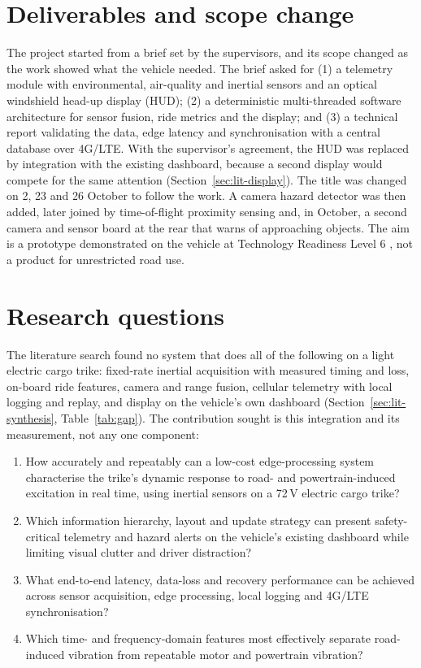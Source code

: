 \section{Deliverables and scope change}

The project started from a brief set by the supervisors, and its scope changed as the work showed what the vehicle needed. The brief \cite{winberg2026} asked for (1) a telemetry module with environmental, air-quality and inertial sensors and an optical windshield head-up display (HUD); (2) a deterministic multi-threaded software architecture for sensor fusion, ride metrics and the display; and (3) a technical report validating the data, edge latency and synchronisation with a central database over 4G/LTE. With the supervisor's agreement, the HUD was replaced by integration with the existing dashboard, because a second display would compete for the same attention \cite{zhu2021} (Section~\ref{sec:lit-display}). The title was changed on 2, 23 and 26 October to follow the work. A camera hazard detector was then added, later joined by time-of-flight proximity sensing and, in October, a second camera and sensor board at the rear that warns of approaching objects. The aim is a prototype demonstrated on the vehicle at Technology Readiness Level 6 \cite{kimmel2020}, not a product for unrestricted road use.

\section{Research questions}
\label{sec:rqs}

The literature search found no system that does all of the following on a light electric cargo trike: fixed-rate inertial acquisition with measured timing and loss, on-board ride features, camera and range fusion, cellular telemetry with local logging and replay, and display on the vehicle's own dashboard (Section~\ref{sec:lit-synthesis}, Table~\ref{tab:gap}). The contribution sought is this integration and its measurement, not any one component:

\begin{enumerate}
\item[RQ1] How accurately and repeatably can a low-cost edge-processing system characterise the trike's dynamic response to road- and powertrain-induced excitation in real time, using inertial sensors on a 72\,V electric cargo trike?
\item[RQ2] Which information hierarchy, layout and update strategy can present safety-critical telemetry and hazard alerts on the vehicle's existing dashboard while limiting visual clutter and driver distraction?
\item[RQ3] What end-to-end latency, data-loss and recovery performance can be achieved across sensor acquisition, edge processing, local logging and 4G/LTE synchronisation?
\item[RQ4] Which time- and frequency-domain features most effectively separate road-induced vibration from repeatable motor and powertrain vibration?
\end{enumerate}

